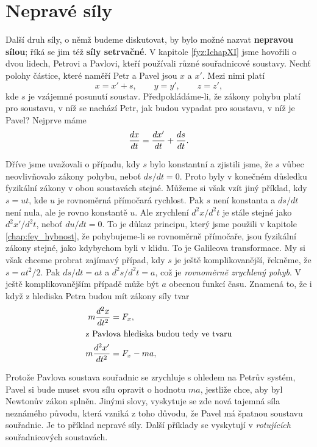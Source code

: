 {  \section{Nepravé síly}\label{fyz:IchapXIIsecVI}
    Další druh síly, o němž budeme diskutovat, by bylo možné nazvat \textbf{nepravou sílou}; říká 
    se jim též \textbf{síly setrvačné}. V kapitole \ref{fyz:IchapXI} jsme hovořili o dvou 
    lidech, Petrovi a Pavlovi, kteří používali různé souřadnicové soustavy. Nechť polohy částice, 
    které naměří Petr a Pavel jsou \(x\) a \(x'\). Mezi nimi platí
    \begin{equation}\label{FYZ:eq0178}
      x = x' + s, \qquad y=y', \qquad z=z',
    \end{equation}
    kde \(s\) je vzájemné posunutí soustav. Předpokládáme-li, že zákony pohybu platí pro soustavu, 
    v níž se nachází Petr, jak budou vypadat pro soustavu, v níž je Pavel? Nejprve máme
    \begin{equation}\label{FYZ:eq0179}
      \dfrac{d x}{d t} = \dfrac{d x'}{d t} + \dfrac{d s}{d t}.
    \end{equation}
    
    Dříve jsme uvažovali o případu, kdy \(s\) bylo konstantní a zjistili jsme, že \(s\) vůbec 
    neovlivňovalo zákony pohybu, neboť \(ds/dt = 0\). Proto byly v konečném důsledku fyzikální 
    zákony v obou soustavách stejné. Můžeme si však vzít jiný příklad, kdy \(s=ut\), kde \(u\) je 
    rovnoměrná přímočará rychlost. Pak \(s\) není konstanta a \(ds/dt\) není nula, ale je rovno 
    konstantě \(u\). Ale zrychlení \(d^2x/d^2t\) je stále stejné jako \(d^2x'/d^2t\), neboť 
    \(du/dt=0\). To je důkaz principu, který jsme použili v kapitole \ref{chap:fey_hybnost}, že 
    pohybujeme-li se rovnoměrně přímočaře, jsou fyzikální zákony stejné, jako kdybychom byli v 
    klidu. To je Galileova transformace. My si však chceme probrat zajímavý případ, kdy \(s\) je 
    ještě komplikovanější, řekněme, že \(s=at^2/2\). Pak \(ds/dt=at\) a \(d^2s/d^2t = a\), což je 
    \emph{rovnoměrně zrychlený pohyb}. V ještě komplikovanějším případě může být \(a\) obecnou 
    funkcí času. Znamená to, že i když z hlediska Petra budou mít zákony síly tvar
    \begin{align}
      m\dfrac{d^2 x}{d t^2}  &= F_x,        \label{FYZ:eq0180} \\
      \shortintertext{z Pavlova hlediska budou tedy ve tvaru} 
      m\dfrac{d^2 x'}{d t^2} &= F_x - ma,   \label{FYZ:eq0181}
    \end{align}
    
    Protože Pavlova soustava souřadnic se zrychluje s ohledem na Petrův systém, Pavel si bude muset 
    svou sílu opravit o hodnotu \(ma\), jestliže chce, aby byl Newtonův zákon splněn. Jinými slovy, 
    vyskytuje se zde nová tajemná síla neznámého původu, která vzniká z toho důvodu, že Pavel má 
    špatnou soustavu souřadnic. Je to příklad nepravé síly. Další příklady se vyskytují v 
    \emph{rotujících} souřadnicových soustavách.
    
}

